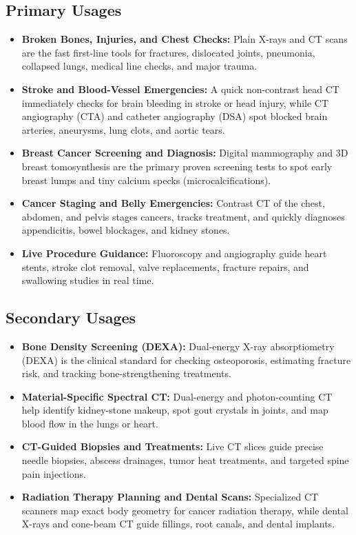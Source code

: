 \subsection{Primary Usages}
\begin{itemize}
  \item \textbf{Broken Bones, Injuries, and Chest Checks:} Plain X-rays and CT scans are the fast first-line tools for fractures, dislocated joints, pneumonia, collapsed lungs, medical line checks, and major trauma.
  \item \textbf{Stroke and Blood-Vessel Emergencies:} A quick non-contrast head CT immediately checks for brain bleeding in stroke or head injury, while CT angiography (CTA) and catheter angiography (DSA) spot blocked brain arteries, aneurysms, lung clots, and aortic tears.
  \item \textbf{Breast Cancer Screening and Diagnosis:} Digital mammography and 3D breast tomosynthesis are the primary proven screening tests to spot early breast lumps and tiny calcium specks (microcalcifications).
  \item \textbf{Cancer Staging and Belly Emergencies:} Contrast CT of the chest, abdomen, and pelvis stages cancers, tracks treatment, and quickly diagnoses appendicitis, bowel blockages, and kidney stones.
  \item \textbf{Live Procedure Guidance:} Fluoroscopy and angiography guide heart stents, stroke clot removal, valve replacements, fracture repairs, and swallowing studies in real time.
\end{itemize}

\subsection{Secondary Usages}
\begin{itemize}
  \item \textbf{Bone Density Screening (DEXA):} Dual-energy X-ray absorptiometry (DEXA) is the clinical standard for checking osteoporosis, estimating fracture risk, and tracking bone-strengthening treatments.
  \item \textbf{Material-Specific Spectral CT:} Dual-energy and photon-counting CT help identify kidney-stone makeup, spot gout crystals in joints, and map blood flow in the lungs or heart.
  \item \textbf{CT-Guided Biopsies and Treatments:} Live CT slices guide precise needle biopsies, abscess drainages, tumor heat treatments, and targeted spine pain injections.
  \item \textbf{Radiation Therapy Planning and Dental Scans:} Specialized CT scanners map exact body geometry for cancer radiation therapy, while dental X-rays and cone-beam CT guide fillings, root canals, and dental implants.
\end{itemize}

